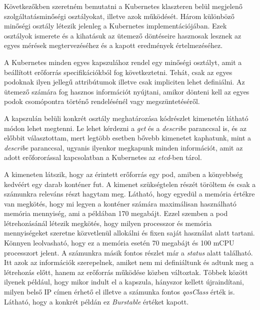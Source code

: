 Következőkben szeretném bemutatni a Kubernetes klaszteren belül megjelenő szolgáltatásminőségi osztályokat, illetve azok működését.
Három különböző minőségi osztály létezik jelenleg a Kubernetes implementációjában\citep{KubernetesQoSClasses}. 
Ezek osztályok ismerete és a kihatásuk az ütemező döntéseire hasznosak lesznek az egyes mérések megtervezéséhez és a kapott eredmények értelmezéséhez.

A Kubernetes minden egyes kapszulához rendel egy minőségi osztályt, amit a beállított erőforrás specifikációkból fog következtetni.
Tehát, csak az egyes podoknak ilyen jellegű attribútumok illetve csak impliciten lehet definiálni.
Az ütemező számára fog hasznos információt nyújtani, amikor dönteni kell az egyes podok csomópontra történő rendelésénél vagy megszüntetéséről.

A kapszulán belüli konkrét osztály meghatározása  kódrészlet kimenetén látható módon lehet megtenni.
Le lehet kérdezni a \textit{get} és a \textit{describe} paranccsal is, és az előbbit választottam, mert legtöbb esetben bővebb kimenetet kaphatunk, mint a \textit{describe} paranccsal, ugyanis ilyenkor megkapunk minden információt, amit az adott erőfororással kapcsolatban a Kubernetes az \textit{etcd}-ben tárol.

A kimeneten látszik, hogy az érintett erőforrás egy pod, amiben a könyebbség kedvéért egy darab konténer fut.
A kimenet szükségtelen részét töröltem és csak a számunkra releváns részt hagytam meg.
Látható, hogy egyedül a memória értékre van megkötés, hogy mi legyen a konténer számára maximálisan használható memória mennyiség, ami a példában 170 megabájt. 
Ezzel szemben a pod létrehozásánál létezik megkötés, hogy milyen processzor és memória mennyiségeket szeretne közvetlenül allokálni és fixen saját használat alatt tartani.
Könnyen leolvasható, hogy ez a memória esetén 70 megabájt és 100 mCPU processzort jelent.
A számunkra másik fontos részlet már a \textit{status} alatt található.
Itt azok az információk szerepelnek, amiket nem mi definiáltunk és adtunk meg a létrehozás előtt, hanem az erőforrás működése közben változtak.
Többek között ilyenek például, hogy mikor indult el a kapszula, hányszor kellett újraindítani, milyen belső IP címen érhető el illetve a számunka fontos \textit{qosClass} érték is.
Látható, hogy a konkrét példán ez \textit{Burstable} értéket kapott.

\lstset{caption=Adott kapszula minőségosztályának vizsgálata, label=get_qos_example}


